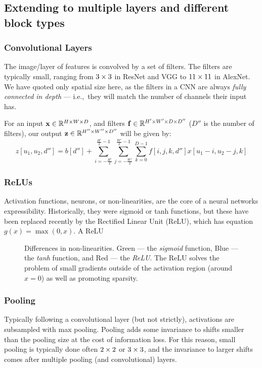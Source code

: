 \subsection{Extending to multiple layers and different block types}

\subsubsection{Convolutional Layers}
  The image/layer of features is convolved by a set of filters.
  The filters are typically small, ranging from $3\times 3$ in ResNet and VGG
  to $11\times 11$ in AlexNet. We have quoted only spatial size
  here, as the filters in a CNN are always \emph{fully connected in depth} ---
  i.e.,\ they will match the number of channels their input has.

  For an input $\mathbf{x} \in \mathbb{R}^{H\times W\times D}$, and filters 
  $\mathbf{f} \in \mathbb{R}^{H'\times W'  \times D \times D''}$ ($D''$ is the 
  number of filters), our output $\mathbf{z} \in
  \mathbb{R}^{H''\times W'' \times D''}$ will be given by:
  \begin{equation}
    z[u_1, u_2, d''] = b[d''] + \sum_{i=-\frac{H'}{2}}^{\frac{H'}{2}-1}
                       \sum_{j=-\frac{W'}{2}}^{\frac{W'}{2}-1}  \sum_{k=0}^{D-1}  
                        f[i, j, k, d''] x[u_1-i, u_2-j, k]
  \end{equation}

\subsubsection{ReLUs}
  Activation functions, neurons, or non-linearities, are the core of a neural networks
  expressibility. Historically, they were sigmoid or tanh functions, but these
  have been replaced recently by the Rectified Linear Unit (ReLU), which has
  equation $g(x) = \max(0,x)$. A ReLU
  \begin{figure}
    \centering
      \caption[Differences in non-linearities]
              {Differences in non-linearities. Green --- the \emph{sigmoid} function, 
               Blue --- the \emph{tanh} function, and Red --- the \emph{ReLU}. The ReLU
               solves the problem of small gradients outside of the activation
               region (around $x=0$) as well as promoting sparsity.}\label{fig:ch2:nonlinearities}
  \end{figure}


\subsubsection{Pooling}
  Typically following a convolutional layer (but not strictly), activations are subsampled with
  max pooling. Pooling adds some invariance to shifts smaller than the pooling
  size at the cost of information loss. For this reason, small pooling is
  typically done often $2\times 2$ or $3\times 3$, and the invariance to larger shifts
  comes after multiple pooling (and convolutional) layers.
  
